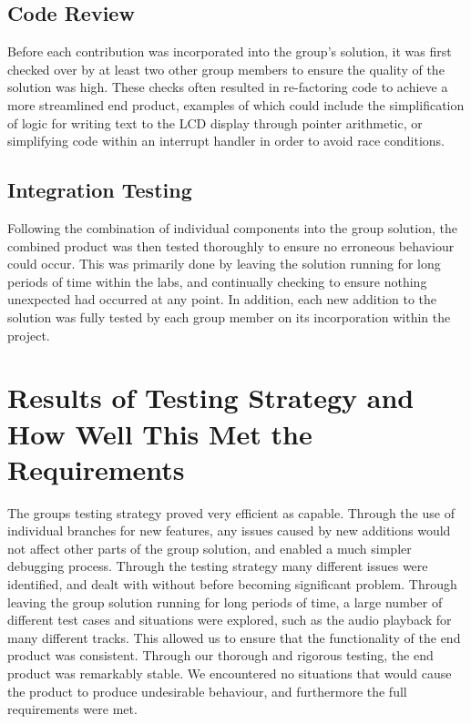 \subsection*{Code Review}

Before each contribution was incorporated into the group's solution, it was 
first checked over by at least two other group members to ensure the quality of 
the solution was high. These checks often resulted in re-factoring code to 
achieve a more streamlined end product, examples of which could include the 
simplification of logic for writing text to the LCD display through pointer 
arithmetic, or simplifying code within an interrupt handler in order to avoid 
race conditions. 

\subsection*{Integration Testing}

Following the combination of individual components into the group solution, the 
combined product was then tested thoroughly to ensure no erroneous behaviour 
could occur. This was primarily done by leaving the solution running for long 
periods of time within the labs, and continually checking to ensure nothing unexpected 
had occurred at any point.
In addition, each new addition to the solution was fully tested by each group 
member on its incorporation within the project. 

\section{Results of Testing Strategy and How Well This Met the Requirements}

The groups testing strategy proved very efficient as capable. Through the use 
of individual branches for new features, any issues caused by new additions would 
not affect other parts of the group solution, and enabled a much simpler debugging 
process.  
Through the testing strategy many different issues were identified, and dealt 
with without before becoming significant problem. 
Through leaving the group solution running for long periods of time, a large 
number of different test cases and situations were explored, such as the audio 
playback for many different tracks. This allowed us to ensure that the 
functionality of the end product was consistent.
Through our thorough and rigorous testing, the end product was remarkably stable. 
We encountered no situations that would cause the product to produce undesirable 
behaviour, and furthermore the full requirements were met.

